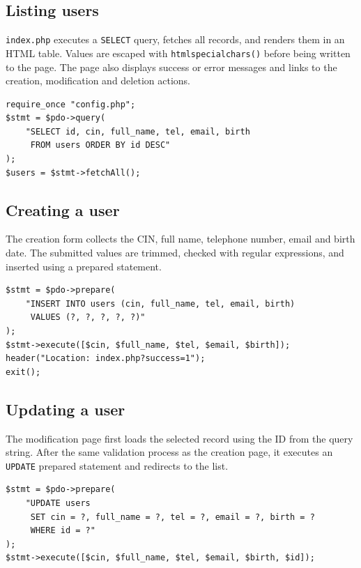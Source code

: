 \documentclass[12pt,a4paper]{article}
\begin{document}
\subsection{Listing users}

\texttt{index.php} executes a \texttt{SELECT} query, fetches all records, and
renders them in an HTML table. Values are escaped with
\texttt{htmlspecialchars()} before being written to the page. The page also
displays success or error messages and links to the creation, modification and
deletion actions.

\begin{lstlisting}[caption={Core listing query}]
require_once "config.php";
$stmt = $pdo->query(
    "SELECT id, cin, full_name, tel, email, birth
     FROM users ORDER BY id DESC"
);
$users = $stmt->fetchAll();
\end{lstlisting}

\subsection{Creating a user}

The creation form collects the CIN, full name, telephone number, email and
birth date. The submitted values are trimmed, checked with regular expressions,
and inserted using a prepared statement.

\begin{lstlisting}[caption={Core insertion logic}]
$stmt = $pdo->prepare(
    "INSERT INTO users (cin, full_name, tel, email, birth)
     VALUES (?, ?, ?, ?, ?)"
);
$stmt->execute([$cin, $full_name, $tel, $email, $birth]);
header("Location: index.php?success=1");
exit();
\end{lstlisting}

\subsection{Updating a user}

The modification page first loads the selected record using the ID from the
query string. After the same validation process as the creation page, it
executes an \texttt{UPDATE} prepared statement and redirects to the list.

\begin{lstlisting}[caption={Core update logic}]
$stmt = $pdo->prepare(
    "UPDATE users
     SET cin = ?, full_name = ?, tel = ?, email = ?, birth = ?
     WHERE id = ?"
);
$stmt->execute([$cin, $full_name, $tel, $email, $birth, $id]);
\end{lstlisting}
\end{document}
